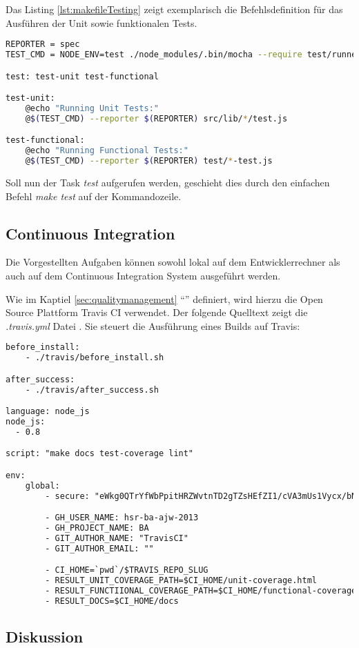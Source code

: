 Das Listing \ref{lst:makefileTesting} zeigt exemplarisch die Befehlsdefinition für das Ausführen der Unit sowie funktionalen Tests.

\begin{lstlisting}[language=Bash, caption=Ausschnitt Makefile: Testing \cite{RoomiesMakefile}, label=lst:makefileTesting]
REPORTER = spec
TEST_CMD = NODE_ENV=test ./node_modules/.bin/mocha --require test/runner.js --globals config

test: test-unit test-functional

test-unit:
	@echo "Running Unit Tests:"
	@$(TEST_CMD) --reporter $(REPORTER) src/lib/*/test.js

test-functional:
	@echo "Running Functional Tests:"
	@$(TEST_CMD) --reporter $(REPORTER) test/*-test.js
\end{lstlisting}

Soll nun der Task \emph{test} aufgerufen werden, geschieht dies durch den einfachen Befehl \emph{make test} auf der Kommandozeile.


\subsection*{Continuous Integration}
Die Vorgestellten Aufgaben können sowohl lokal auf dem Entwicklerrechner als auch auf dem Continuous Integration System ausgeführt werden.

Wie im Kaptiel \ref{sec:qualitymanagement} ``'' definiert, wird hierzu die Open Source Plattform Travis CI \cite{TravisCI} verwendet. Der folgende Quelltext zeigt die \emph{.travis.yml} Datei \cite{RoomiesTravisYML}. Sie steuert die Ausführung eines Builds auf Travis:

\begin{lstlisting}[language=XML, caption=.travis.yml \cite{RoomiesTravisYML}, label=lst:roomiesTravisYML]
before_install:
    - ./travis/before_install.sh

after_success:
    - ./travis/after_success.sh

language: node_js
node_js:
  - 0.8

script: "make docs test-coverage lint"

env:
    global:
        - secure: "eWkg0QTrYfWbPpitHRZWvtnTD2gTZsHEfZI1/cVA3mUs1Vycx/bNHzAt4fNm\nWR7EsTkaNLkc6p3JA797kwIyCugt+0D2tTdn7ra532Gye9u/KGjJB38HuJ0A\nQxibB+ahyAOJL+NjRNAQsME2lFmNv950/4sRbXYybijxJD6fqcw="

        - GH_USER_NAME: hsr-ba-ajw-2013
        - GH_PROJECT_NAME: BA
        - GIT_AUTHOR_NAME: "TravisCI"
        - GIT_AUTHOR_EMAIL: ""

        - CI_HOME=`pwd`/$TRAVIS_REPO_SLUG
        - RESULT_UNIT_COVERAGE_PATH=$CI_HOME/unit-coverage.html
        - RESULT_FUNCTIIONAL_COVERAGE_PATH=$CI_HOME/functional-coverage.html
        - RESULT_DOCS=$CI_HOME/docs
\end{lstlisting}

\subsection*{Diskussion}
